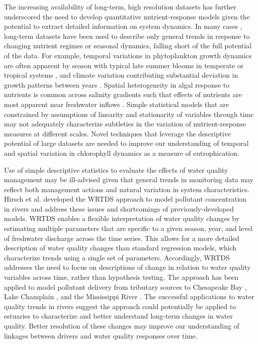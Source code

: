 \documentclass{svjour3}\usepackage[]{graphicx}\usepackage[]{color}
\begin{document}
The increasing availability of long-term, high resolution datasets has further underscored the need to develop quantitative nutrient-response models given the potential to extract detailed information on system dynamics.  In many cases \cite{Caffrey03,Greening06}, long-term datasets have been used to describe only general trends in response to changing nutrient regimes or seasonal dynamics, falling short of the full potential of the data.  For example, temporal variations in phytoplankton growth dynamics are often apparent by season with typical late summer blooms in temperate or tropical systems \cite{Cloern96}, and climate variation contributing substantial deviation in growth patterns between years \cite{Jassby02}.  Spatial heterogeneity in algal response to nutrients is common across salinity gradients such that effects of nutrients are most apparent near freshwater inflows \cite{Cloern96}.  Simple statistical models that are constrained by assumptions of linearity and stationarity  of variables through time may not adequately characterize subtleties in the variation of nutrient-response measures at different scales.  Novel techniques that leverage the descriptive potential of large datasets are needed to improve our understanding of temporal and spatial variation in chlorophyll dynamics as a measure of eutrophication.

Use of simple descriptive statistics to evaluate the effects of water quality management may be ill-advised given that general trends in monitoring data may reflect both management actions and natural variation in system characteristics.  Hirsch et al. \cite{Hirsch10} developed the \ac{WRTDS} approach to model pollutant concentration in rivers and address these issues and shortcomings of previously-developed models.  \ac{WRTDS} enables a flexible interpretation of water quality changes by estimating multiple parameters that are specific to a given season, year, and level of freshwater discharge across the time series.  This allows for a more detailed description of water quality changes than standard regression models, which characterize trends using a single set of parameters.  Accordingly, \ac{WRTDS} addresses the need to focus on descriptions of change in relation to water quality variables across time, rather than hypothesis testing. The approach has been applied to model pollutant delivery from tributary sources to Chesapeake Bay \cite{Hirsch10,Moyer12,Zhang13}, Lake Champlain \cite{Medalie12}, and the Mississippi River \cite{Sprague11}.  The successful applications to water quality trends in rivers suggest the approach could potentially be applied to estuaries to characterize and better understand long-term changes in water quality.  Better resolution of these changes may improve our understanding of linkages between drivers and water quality responses over time. 
\end{document}
